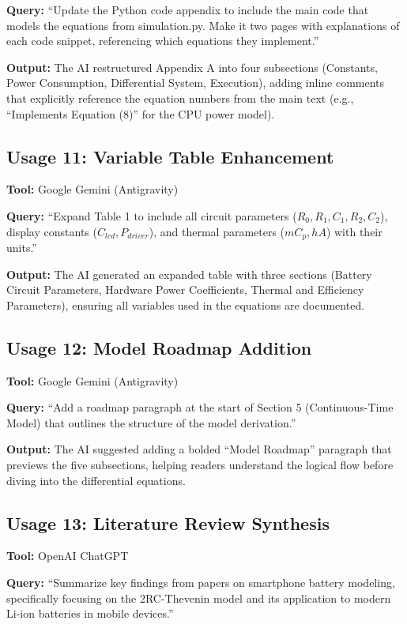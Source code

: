 \documentclass[12pt]{article}
\begin{document}
\textbf{Query:} ``Update the Python code appendix to include the main code that models the equations from simulation.py. Make it two pages with explanations of each code snippet, referencing which equations they implement.''

\textbf{Output:} The AI restructured Appendix A into four subsections (Constants, Power Consumption, Differential System, Execution), adding inline comments that explicitly reference the equation numbers from the main text (e.g., ``Implements Equation (8)'' for the CPU power model).

\newpage

\subsection*{Usage 11: Variable Table Enhancement}
\textbf{Tool:} Google Gemini (Antigravity)

\textbf{Query:} ``Expand Table 1 to include all circuit parameters ($R_0, R_1, C_1, R_2, C_2$), display constants ($C_{lcd}, P_{driver}$), and thermal parameters ($mC_p, hA$) with their units.''

\textbf{Output:} The AI generated an expanded table with three sections (Battery Circuit Parameters, Hardware Power Coefficients, Thermal and Efficiency Parameters), ensuring all variables used in the equations are documented.

\subsection*{Usage 12: Model Roadmap Addition}
\textbf{Tool:} Google Gemini (Antigravity)

\textbf{Query:} ``Add a roadmap paragraph at the start of Section 5 (Continuous-Time Model) that outlines the structure of the model derivation.''

\textbf{Output:} The AI suggested adding a bolded ``Model Roadmap'' paragraph that previews the five subsections, helping readers understand the logical flow before diving into the differential equations.

\subsection*{Usage 13: Literature Review Synthesis}
\textbf{Tool:} OpenAI ChatGPT

\textbf{Query:} ``Summarize key findings from papers on smartphone battery modeling, specifically focusing on the 2RC-Thevenin model and its application to modern Li-ion batteries in mobile devices.''
\end{document}
